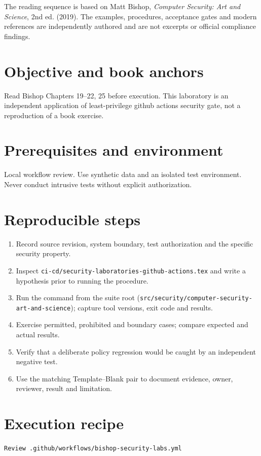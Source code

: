 \documentclass[10pt,letterpaper]{article}
\begin{document}
\makedoctocpage
\begin{notebox}
The reading sequence is based on Matt Bishop, \emph{Computer Security: Art and Science}, 2nd ed. (2019). The examples, procedures, acceptance gates and modern references are independently authored and are not excerpts or official compliance findings.
\end{notebox}
\section{Objective and book anchors}
Read Bishop Chapters 19--22, 25 before execution. This laboratory is an independent application of least-privilege github actions security gate, not a reproduction of a book exercise.
\section{Prerequisites and environment}
Local workflow review. Use synthetic data and an isolated test environment. Never conduct intrusive tests without explicit authorization.
\section{Reproducible steps}
\begin{enumerate}
\item Record source revision, system boundary, test authorization and the specific security property.
\item Inspect \texttt{ci-cd/security-laboratories-github-actions.tex} and write a hypothesis prior to running the procedure.
\item Run the command from the suite root (\texttt{src/security/computer-security-art-and-science}); capture tool versions, exit code and results.
\item Exercise permitted, prohibited and boundary cases; compare expected and actual results.
\item Verify that a deliberate policy regression would be caught by an independent negative test.
\item Use the matching Template--Blank pair to document evidence, owner, reviewer, result and limitation.
\end{enumerate}
\section{Execution recipe}
\begin{viewbox}\raggedright\small\texttt{Review .github/workflows/bishop-security-labs.yml}\end{viewbox}
\end{document}
